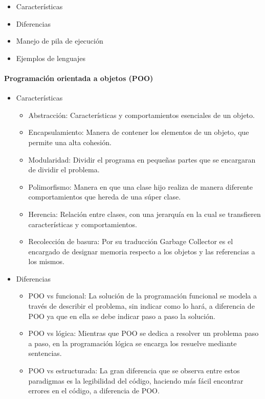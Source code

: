 \documentclass[10pt]{article}
\begin{document}
\begin{itemize}
  \item Características
  \item Diferencias
  \item Manejo de pila de ejecución
  \item Ejemplos de lenguajes
\end{itemize}

\paragraph{\normalsize Programación orientada a objetos (POO)}
\begin{itemize}
  \item Características
  	\begin{itemize}
  		\item Abstracción: Características y comportamientos esenciales de un objeto.
  		\item Encapsulamiento: Manera de contener los elementos de un objeto, que permite una alta cohesión.
  		\item Modularidad: Dividir el programa en pequeñas partes que se encargaran de dividir el problema.
  		\item Polimorfismo: Manera en que una clase hijo realiza de manera diferente comportamientos que hereda de una súper clase.
  		\item Herencia: Relación entre clases, con una jerarquía en la cual se transfieren características y comportamientos.
  		\item Recolección de basura: Por su traducción Garbage Collector es el encargado de designar memoria respecto a los objetos y las referencias a los mismos.
  	\end{itemize}
  \item Diferencias
  	\begin{itemize}
  		\item POO vs funcional: La solución de la programación funcional se modela a través de describir el problema, sin indicar como lo hará, a diferencia de POO ya que en ella se debe indicar paso a paso la solución.
      \item POO vs lógica: Mientras que POO se dedica a resolver un problema paso a paso, en la programación lógica se encarga los resuelve mediante sentencias.
      \item POO vs estructurada: La gran diferencia que se observa entre estos paradigmas es la legibilidad del código, haciendo más fácil encontrar errores en el código, a diferencia de POO.

\end{itemize}
\end{itemize}
\end{document}
